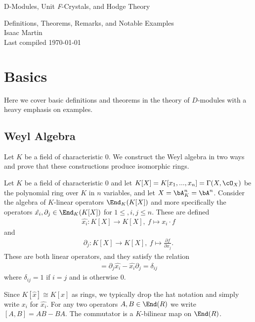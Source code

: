 


\begin{center}
	\Large
	\begin{LARGE}
		D-Modules, Unit \textit{F}-Crystals, and Hodge Theory \\
	\end{LARGE}
	Definitions, Theorems, Remarks, and Notable Examples \\
	Isaac Martin \\
    Last compiled \today
\end{center}
\normalsize
\vspace{-2mm}
\hru

\tableofcontents
\newpage
\section{Basics}
Here we cover basic definitions and theorems in the theory of $D$-modules with a heavy emphasis on examples.

\subsection{Weyl Algebra}
Let $K$ be a field of characteristic $0$. We construct the Weyl algebra in two ways and prove that these constructions produce isomorphic rings.

\begin{defn}\label{defn:Weyl-algebra-construction-1}
	Let $K$ be a field of characteristic $0$ and let $K[X] = K[x_1,...,x_n] = \Gamma(X,\cO_X)$ be the polynomial ring over $K$ in $n$ variables, and let $X = \bA^n_K = \bA^n$. Consider the algebra of $K$-linear operators $\End_K(K[X])$ and more specifically the operators $\hat{x_i}, \partial_j \in \End_K(K[X])$ for $1\leq, i,j \leq n$. These are defined
	\begin{align*}
		\hat{x_i}: K[X]\to K[X], ~ f \mapsto x_i \cdot f
	\end{align*}
	and 
	\begin{align*}
		\partial_j:K[X]\to K[X], ~ f\mapsto \frac{\partial f}{\partial x_j}.
	\end{align*}
	These are both linear operators, and they satisfy the relation
	\begin{align*}
		[\partial_j, \hat{x_i}] = \partial_j \hat{x_i} - \hat{x_i}\partial_j = \delta_{ij}
	\end{align*}
	where $\delta_{ij} = 1$ if $i = j$ and is otherwise 0. 
\end{defn}
Since $K[\hat{x}] \cong K[x]$ as rings, we typically drop the hat notation and simply write $x_i$ for $\hat{x_i}$. For any two operators $A,B \in \End(R)$ we write  $[A,B] = AB - BA$. The commutator is a $K$-bilinear map on $\End(R)$.

